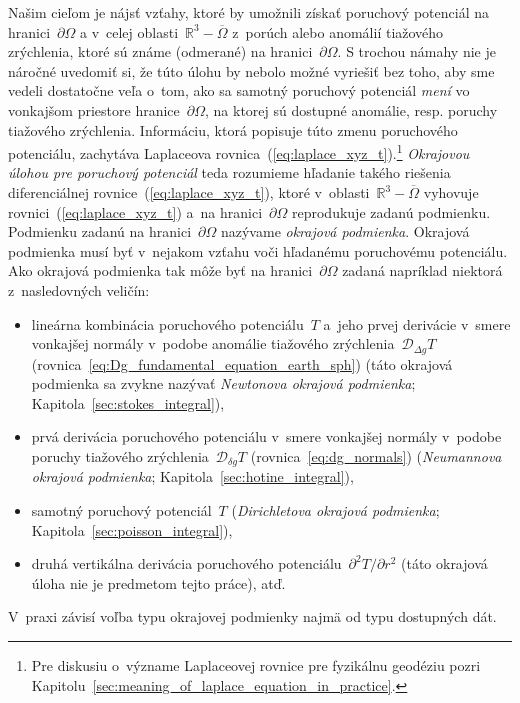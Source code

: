 \documentclass[a4paper, 12pt]{book}
\newcommand{\DIFF}{\mathcal D}
\begin{document}
Našim cieľom je nájsť vzťahy, ktoré by umožnili získať poruchový potenciál na 
hranici~$\partial \Omega$ a v~celej oblasti~$\mathbb{R}^3 - \overline{\Omega}$ 
z~porúch alebo anomálií tiažového zrýchlenia, ktoré sú známe (odmerané) na 
hranici~$\partial \Omega$.  S trochou námahy nie je náročné uvedomiť si, že 
túto úlohu by nebolo možné vyriešiť bez toho, aby sme vedeli dostatočne veľa 
o~tom, ako sa samotný poruchový potenciál \emph{mení} vo vonkajšom priestore 
hranice~$\partial\Omega$, na ktorej sú dostupné anomálie, resp. poruchy 
tiažového zrýchlenia.  Informáciu, ktorá popisuje túto zmenu poruchového 
potenciálu, zachytáva Laplaceova rovnica~(\ref{eq:laplace_xyz_t}).\footnote{Pre 
diskusiu o~význame Laplaceovej rovnice pre fyzikálnu geodéziu pozri 
Kapitolu~\ref{sec:meaning_of_laplace_equation_in_practice}.}  \emph{Okrajovou 
úlohou pre poruchový potenciál} teda rozumieme hľadanie takého riešenia 
diferenciálnej rovnice~(\ref{eq:laplace_xyz_t}), ktoré v~oblasti~$\mathbb{R}^3 
- \overline\Omega$ vyhovuje rovnici~(\ref{eq:laplace_xyz_t}) a~na 
hranici~$\partial \Omega$ reprodukuje zadanú podmienku.  Podmienku zadanú na 
hranici~$\partial \Omega$ nazývame \emph{okrajová podmienka}.  Okrajová 
podmienka musí byť v~nejakom vzťahu voči hľadanému poruchovému potenciálu.  Ako 
okrajová podmienka tak môže byť na hranici~$\partial \Omega$ zadaná napríklad 
niektorá z~nasledovných veličín:
%
\begin{itemize}
\item lineárna kombinácia poruchového potenciálu~$T$ a~jeho prvej derivácie 
v~smere vonkajšej normály v~podobe anomálie tiažového zrýchlenia~$\DIFF_{\Delta 
g}T$ (rovnica~\ref{eq:Dg_fundamental_equation_earth_sph}) (táto okrajová 
podmienka sa zvykne nazývať \emph{Newtonova okrajová podmienka}; 
Kapitola~\ref{sec:stokes_integral}),
%
\item prvá derivácia poruchového potenciálu v~smere vonkajšej normály v~podobe 
poruchy tiažového zrýchlenia~$\DIFF_{\delta g} T$ (rovnica~\ref{eq:dg_normals}) 
(\emph{Neumannova okrajová podmienka}; Kapitola~\ref{sec:hotine_integral}),
%
\item samotný poruchový potenciál~$T$ (\emph{Dirichletova okrajová podmienka}; 
Kapitola~\ref{sec:poisson_integral}),
%
\item druhá vertikálna derivácia poruchového potenciálu~$\partial^2 
T / \partial r^2$ (táto okrajová úloha nie je predmetom tejto práce), atď.
\end{itemize}
%
V~praxi závisí voľba typu okrajovej podmienky najmä od typu dostupných dát.
\end{document}
